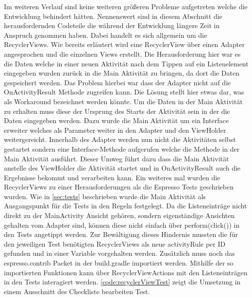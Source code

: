 Im weiteren Verlauf sind keine weiteren größeren Probleme aufgetreten welche die Entwicklung behindert hätten. Nennenswert sind in diesem Abschnitt die herausfordernden Codeteile die während der Entwicklung längere Zeit in Anspruch genommen haben. Dabei handelt es sich allgemein um die RecyclerViews. Wie bereits erläutert wird eine RecyclerView über einen Adapter angesprochen und die einzelnen Views erstellt. Die Herausforderung hier war es die Daten welche in einer neuen Aktivität  nach dem Tippen auf ein Listenelement eingegeben wurden zurück in die Main Aktivität zu bringen, da dort die Daten gespeichert werden. Das Problem hierbei war dass der Adapter nicht auf die OnActivityResult Methode zugreifen kann. Die Lösung stellt hier etwas dar, was als Workaround bezeichnet werden könnte. Um die Daten in der Main Aktivität zu erhalten muss diese der Ursprung des Starts der Aktivität sein in der die Daten eingegeben werden. Dazu wurde die Main Aktivität um ein Interface erweiter welches als Parameter weiter in den Adapter und den ViewHolder weitergereicht. Innerhalb des Adapter werden nun nicht die Aktivitäten selbst gestartet sondern eine Interface-Methode aufgerufen welche die Methode in der Main Aktivität ausführt. Dieser Umweg führt dazu dass die Main Aktivität anstelle des ViewHolder die Aktivität startet und in OnActivityResult auch die Ergebnisse bekommt und verarbeiten kann. Ein weiteres mal wurden die RecyclerViews zu einer Herausforderungen als die Espresso Tests geschrieben wurden. Wie in \autoref{sec:tests} beschrieben wurde die Main Aktivität als Ausgangspunkt für die Tests in den Regeln festgelegt. Da die Listeneinträge nicht direkt zu der MainActivity Ansicht gehören, sondern eigenständige Ansichten gehalten vom Adapter sind, können diese nicht einfach über perform(click()) in den Tests angetippt werden. Zur Bewältigung dieses Hindernis mussten die für den jeweiligen Test benötigten RecyclerViews als neue activityRule per ID gefunden und in einer Variable vorgehalten werden. Zusätzlich muss noch das espresso.contrib Packet in der build.gradle importiert werden. Mithilfe der so importierten Funktionen kann über RecyclerViewActions mit den Listeneinträgen in den Tests interagiert werden. \autoref{code:recyclerViewTest} zeigt die Umsetzung in einem Ausschnitt des Checkliste bearbeiten Test.
\\


